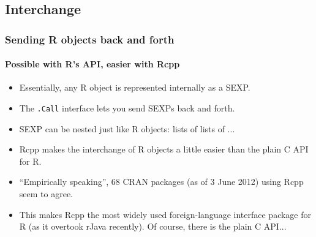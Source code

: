 \documentclass[handout,compress,dvipsnames,pdflatex,beamer]{beamer}
\begin{document}
\subsection{Interchange}
\begin{frame}
  \frametitle{Sending R objects back and forth}
  \framesubtitle{Possible with R's API, easier with Rcpp}
  \begin{itemize}
  \item Essentially, any R object is represented internally as a SEXP.
  \item The \texttt{.Call} interface lets you send SEXPs back and forth.
  \item SEXP can be nested just like R objects: lists of lists of ...
  \item Rcpp makes the interchange of R objects a little easier than the
    plain C API for R. 
  \item ``Empirically speaking'', 68 CRAN packages (as
    of 3 June 2012) using Rcpp seem to agree.
  \item This makes Rcpp the most widely used foreign-language interface
    package for R (as it overtook rJava recently). Of course, there is the
    plain C API...
  \end{itemize}
\end{frame}
\end{document}
